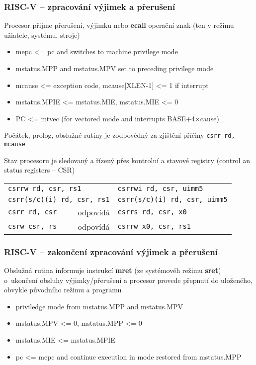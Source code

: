 \documentclass{beamer}
\begin{document}
\begin{frame}
\frametitle{RISC-V -- zpracování výjimek a přerušení}

Procesor přijme přerušení, výjimku nebo \textbf{ecall} operační znak (ten v režimu užiatele, systému, stroje)

\begin{itemize}
 \item mepc <= pc and switches to machine privilege mode
 \item mstatus.MPP and mstatus.MPV set to preceding privilege mode
 \item mcause <= exception code, mcause[XLEN-1] <= 1 if interrupt
 \item mstatus.MPIE <= mstatus.MIE, mstatus.MIE <= 0
 \item PC <= mtvec (for vectored mode and interrupts BASE+4×cause)
\end{itemize}

Počátek, prolog, obslužné rutiny je zodpovědný za zjištění příčiny \texttt{csrr rd, mcause}

Stav procesoru je sledovaný a řízený přes kontrolní a stavové registry (control an status registers -- CSR)

\begin{tabular}{l r l}
\multicolumn{2}{l}{\texttt{csrrw rd, csr, rs1}} & \texttt{csrrwi rd, csr, uimm5} \\
\multicolumn{2}{l}{\texttt{csrr(s/c)(i) rd, csr, rs1}}  & \texttt{csrr(s/c)(i) rd, csr, uimm5} \\
\texttt{csrr rd, csr} &  odpovídá  & \texttt{csrrs rd, csr, x0} \\
\texttt{csrw csr, rs} &  odpovídá  & \texttt{csrrw x0, csr, rs1} \\
\end{tabular}
\end{frame}

\begin{frame}
\frametitle{RISC-V -- zakončení zpracování výjimek a přerušení}

Obslužná rutina informuje instrukcí \textbf{mret} (ze systémovéh režimu \textbf{sret})
o~ukončení obsluhy výjimky/přerušení a procesor provede přepnutí do uloženého, obvykle původního
režimu a programu

\begin{itemize}
 \item priviledge mode from mstatus.MPP and mstatus.MPV
 \item mstatus.MPV <= 0, mstatus.MPP <= 0
 \item mstatus.MIE <= mstatus.MPIE
 \item pc <= mepc and continue execution in mode restored from mstatus.MPP
\end{itemize}
\end{frame}
\end{document}
